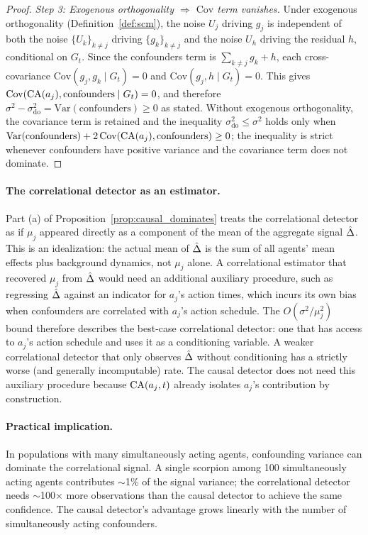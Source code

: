 \begin{proof}
\emph{Step 3: Exogenous orthogonality $\Rightarrow$
$\mathrm{Cov}$ term vanishes.} Under exogenous orthogonality
(Definition~\ref{def:scm}), the noise $U_j$ driving $g_j$ is
independent of both the noise $\{U_k\}_{k \neq j}$ driving
$\{g_k\}_{k \neq j}$ and the noise $U_h$ driving the residual
$h$, conditional on $G_t$. Since the confounders term is
$\sum_{k \neq j} g_k + h$, each cross-covariance
$\mathrm{Cov}(g_j, g_k \mid G_t) = 0$ and
$\mathrm{Cov}(g_j, h \mid G_t) = 0$. This gives
$\mathrm{Cov}(\mathrm{CA}(a_j), \mathrm{confounders} \mid G_t) = 0$,
and therefore
$\sigma^2 - \sigma_{\mathrm{do}}^2 = \mathrm{Var}(\mathrm{confounders})
\geq 0$
as stated. Without exogenous orthogonality, the covariance term is
retained and the inequality
$\sigma_{\mathrm{do}}^2 \leq \sigma^2$ holds only when
$\mathrm{Var}(\mathrm{confounders}) +
2\,\mathrm{Cov}(\mathrm{CA}(a_j), \mathrm{confounders}) \geq 0$; the
inequality is strict whenever confounders have positive variance and
the covariance term does not dominate.
\end{proof}

\paragraph{The correlational detector as an estimator.} Part (a) of
Proposition~\ref{prop:causal_dominates} treats the correlational
detector as if $\mu_j$ appeared directly as a component of the mean
of the aggregate signal $\hat{\Delta}$. This is an idealization: the
actual mean of $\hat{\Delta}$ is the sum of all agents' mean effects
plus background dynamics, not $\mu_j$ alone. A correlational
estimator that recovered $\mu_j$ from $\hat{\Delta}$ would need an
additional auxiliary procedure, such as regressing $\hat{\Delta}$
against an indicator for $a_j$'s action times, which incurs its own
bias when confounders are correlated with $a_j$'s action schedule.
The $O(\sigma^2 / \mu_j^2)$ bound therefore describes the best-case
correlational detector: one that has access to $a_j$'s action schedule
and uses it as a conditioning variable. A weaker correlational
detector that only observes $\hat{\Delta}$ without conditioning has a
strictly worse (and generally incomputable) rate. The causal detector
does not need this auxiliary procedure because
$\mathrm{CA}(a_j, t)$ already isolates $a_j$'s contribution by
construction.

\paragraph{Practical implication.} In populations with many simultaneously
acting agents, confounding variance can dominate the correlational signal.
A single scorpion among 100 simultaneously acting agents contributes
$\sim$1\% of the signal variance; the correlational detector needs
$\sim$100$\times$ more observations than the causal detector to achieve the
same confidence. The causal detector's advantage grows linearly with the
number of simultaneously acting confounders.

